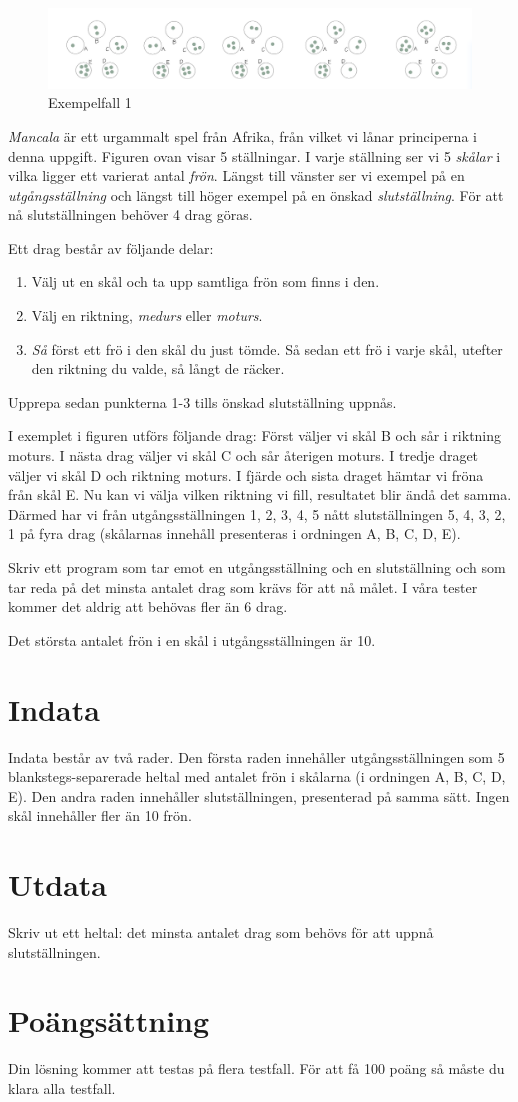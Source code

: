 
\begin{figure}[p]
    \includegraphics{figur.png}
	\caption{Exempelfall 1}
\end{figure}

\emph{Mancala} är ett urgammalt spel från Afrika, från vilket vi lånar principerna i denna uppgift. Figuren ovan visar 5 ställningar. I varje ställning ser vi 5 \emph{skålar} i vilka ligger ett varierat antal \emph{frön}. Längst till vänster ser vi exempel på en \emph{utgångsställning} och längst till höger exempel på en önskad \emph{slutställning}. För att nå slutställningen behöver 4 drag göras.

Ett drag består av följande delar:
\begin{enumerate}
	\item Välj ut en skål och ta upp samtliga frön som finns i den.
	\item Välj en riktning, \emph{medurs} eller \emph{moturs}.
	\item \emph{Så} först ett frö i den skål du just tömde. Så sedan ett frö i varje skål, utefter den riktning du valde, så långt de räcker.
\end{enumerate}

Upprepa sedan punkterna 1-3 tills önskad slutställning uppnås.

I exemplet i figuren utförs följande drag: Först väljer vi skål B och sår i riktning moturs. I nästa drag väljer vi skål C och sår återigen moturs. I tredje draget väljer vi skål D och riktning moturs. I fjärde och sista draget hämtar vi fröna från skål E. Nu kan vi välja vilken riktning vi fill, resultatet blir ändå det samma. Därmed har vi från utgångsställningen 1, 2, 3, 4, 5 nått slutställningen 5, 4, 3, 2, 1 på fyra drag (skålarnas innehåll presenteras i ordningen A, B, C, D, E).

Skriv ett program som tar emot en utgångsställning och en slutställning och som tar reda på det minsta antalet drag som krävs för att nå målet. I våra tester kommer det aldrig att behövas fler än 6 drag.

Det största antalet frön i en skål i utgångsställningen är 10.

\section*{Indata}
Indata består av två rader. Den första raden innehåller utgångsställningen som 5 blankstegs-separerade heltal med antalet frön i skålarna (i ordningen A, B, C, D, E). Den andra raden innehåller slutställningen, presenterad på samma sätt. Ingen skål innehåller fler än 10 frön.

\section*{Utdata}
Skriv ut ett heltal: det minsta antalet drag som behövs för att uppnå slutställningen.

\section*{Poängsättning}
Din lösning kommer att testas på flera testfall. För att få 100 poäng så måste du klara alla testfall.

